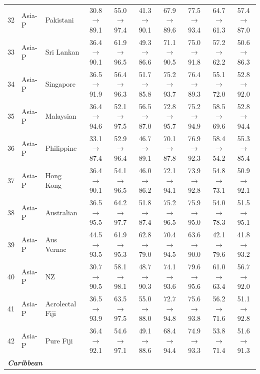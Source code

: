 \begin{table}[t]
{\begin{tabular}{rll c c c c c c c}
32 & Asia-P & Pakistani & 30.8$\rightarrow$89.1 & 55.0$\rightarrow$97.4 & 41.3$\rightarrow$90.1 & 67.9$\rightarrow$89.6 & 77.5$\rightarrow$93.4 & 64.7$\rightarrow$61.3 & 57.4$\rightarrow$87.0 \\
33 & Asia-P & Sri Lankan & 36.4$\rightarrow$90.1 & 61.9$\rightarrow$96.5 & 49.3$\rightarrow$86.6 & 71.1$\rightarrow$90.5 & 75.0$\rightarrow$91.8 & 57.2$\rightarrow$62.2 & 50.6$\rightarrow$86.3 \\
34 & Asia-P & Singapore & 36.5$\rightarrow$91.9 & 56.4$\rightarrow$96.3 & 51.7$\rightarrow$85.8 & 75.2$\rightarrow$93.7 & 76.4$\rightarrow$89.3 & 55.1$\rightarrow$72.0 & 52.8$\rightarrow$92.0 \\
35 & Asia-P & Malaysian & 36.4$\rightarrow$94.6 & 52.1$\rightarrow$97.5 & 56.5$\rightarrow$87.0 & 72.8$\rightarrow$95.7 & 75.2$\rightarrow$94.9 & 58.5$\rightarrow$69.6 & 52.8$\rightarrow$94.4 \\
36 & Asia-P & Philippine & 33.1$\rightarrow$87.4 & 52.9$\rightarrow$96.4 & 46.7$\rightarrow$89.1 & 70.1$\rightarrow$87.8 & 76.9$\rightarrow$92.3 & 58.4$\rightarrow$54.2 & 55.3$\rightarrow$85.4 \\
37 & Asia-P & Hong Kong & 36.4$\rightarrow$90.1 & 54.1$\rightarrow$96.5 & 46.0$\rightarrow$86.2 & 72.1$\rightarrow$94.1 & 73.9$\rightarrow$92.8 & 54.8$\rightarrow$73.1 & 50.9$\rightarrow$92.1 \\
38 & Asia-P & Australian & 36.5$\rightarrow$95.5 & 64.2$\rightarrow$97.7 & 51.8$\rightarrow$87.4 & 75.2$\rightarrow$96.5 & 75.9$\rightarrow$95.0 & 54.0$\rightarrow$78.3 & 51.5$\rightarrow$95.1 \\
39 & Asia-P & Aus Vernac & 44.5$\rightarrow$93.5 & 61.9$\rightarrow$95.3 & 62.8$\rightarrow$79.0 & 70.4$\rightarrow$94.5 & 63.6$\rightarrow$90.0 & 42.1$\rightarrow$79.6 & 41.8$\rightarrow$93.2 \\
40 & Asia-P & NZ & 30.7$\rightarrow$90.5 & 58.1$\rightarrow$98.1 & 48.7$\rightarrow$90.3 & 74.1$\rightarrow$93.6 & 79.6$\rightarrow$95.6 & 61.0$\rightarrow$63.4 & 56.7$\rightarrow$92.0 \\
41 & Asia-P & Acrolectal Fiji & 36.5$\rightarrow$93.9 & 63.5$\rightarrow$97.5 & 55.0$\rightarrow$88.0 & 72.7$\rightarrow$94.8 & 75.6$\rightarrow$93.8 & 56.2$\rightarrow$71.6 & 51.1$\rightarrow$92.8 \\
42 & Asia-P & Pure Fiji & 36.4$\rightarrow$92.1 & 54.6$\rightarrow$97.1 & 49.1$\rightarrow$88.6 & 68.4$\rightarrow$94.4 & 74.9$\rightarrow$93.3 & 53.8$\rightarrow$71.4 & 51.6$\rightarrow$91.3 \\
\midrule
\multicolumn{10}{l}{\textit{\textbf{Caribbean}}} \\

\end{tabular}}
\end{table}
